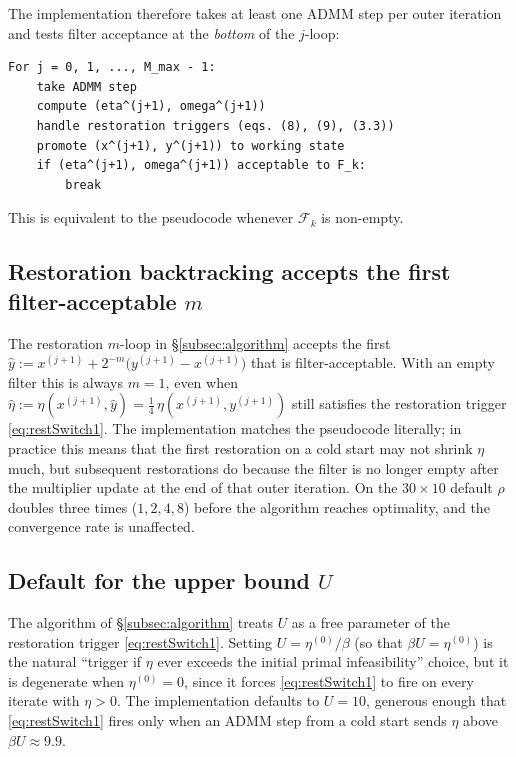\documentclass[11pt]{article}
\begin{document}
The implementation therefore takes at least one ADMM step per outer iteration and tests filter acceptance at the \emph{bottom} of the $j$-loop:
\begin{verbatim}
For j = 0, 1, ..., M_max - 1:
    take ADMM step
    compute (eta^(j+1), omega^(j+1))
    handle restoration triggers (eqs. (8), (9), (3.3))
    promote (x^(j+1), y^(j+1)) to working state
    if (eta^(j+1), omega^(j+1)) acceptable to F_k:
        break
\end{verbatim}
This is equivalent to the pseudocode whenever $\mathcal{F}_k$ is non-empty.

\subsection{Restoration backtracking accepts the first filter-acceptable $m$}\label{subsec:rest-first-m}

The restoration $m$-loop in \S\ref{subsec:algorithm} accepts the first $\hat y := x^{(j+1)} + 2^{-m}\bigl(y^{(j+1)} - x^{(j+1)}\bigr)$ that is filter-acceptable. With an empty filter this is always $m = 1$, even when $\hat\eta := \eta(x^{(j+1)}, \hat y) = \tfrac{1}{4}\,\eta(x^{(j+1)}, y^{(j+1)})$ still satisfies the restoration trigger \eqref{eq:restSwitch1}. The implementation matches the pseudocode literally; in practice this means that the first restoration on a cold start may not shrink $\eta$ much, but subsequent restorations do because the filter is no longer empty after the multiplier update at the end of that outer iteration. On the $30\times10$ default $\rho$ doubles three times ($1, 2, 4, 8$) before the algorithm reaches optimality, and the convergence rate is unaffected.

\subsection{Default for the upper bound $U$}\label{subsec:U-default}

The algorithm of \S\ref{subsec:algorithm} treats $U$ as a free parameter of the restoration trigger \eqref{eq:restSwitch1}. Setting $U = \eta^{(0)} / \beta$ (so that $\beta U = \eta^{(0)}$) is the natural ``trigger if $\eta$ ever exceeds the initial primal infeasibility'' choice, but it is degenerate when $\eta^{(0)} = 0$, since it forces \eqref{eq:restSwitch1} to fire on every iterate with $\eta > 0$. The implementation defaults to $U = 10$, generous enough that \eqref{eq:restSwitch1} fires only when an ADMM step from a cold start sends $\eta$ above $\beta U \approx 9.9$.
\end{document}
